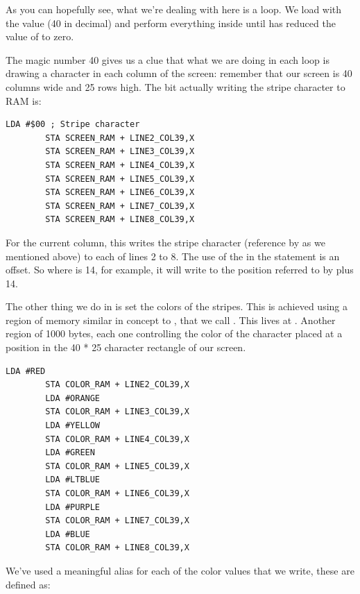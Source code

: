 As you can hopefully see, what we're dealing with here is a loop. We load  with the value  (40 in decimal)
and perform everything inside  until  has reduced the value of  to zero.

The magic number 40 gives us a clue that what we are doing in each loop is drawing a character in each column of the screen:
remember that our screen is 40 columns wide and 25 rows high. The bit actually writing the stripe character to RAM is:

\begin{lstlisting}[caption=In \icode{DrawStripesBehindTitle}]
        LDA #$00 ; Stripe character
        STA SCREEN_RAM + LINE2_COL39,X
        STA SCREEN_RAM + LINE3_COL39,X
        STA SCREEN_RAM + LINE4_COL39,X
        STA SCREEN_RAM + LINE5_COL39,X
        STA SCREEN_RAM + LINE6_COL39,X
        STA SCREEN_RAM + LINE7_COL39,X
        STA SCREEN_RAM + LINE8_COL39,X
\end{lstlisting}

For the current column, this writes the stripe character (reference by  as we mentioned above) to each of lines
2 to 8. The use of the  in the  statement is an offset. So where  is 14, for example,
it will write to the position referred to by  plus 14.



The other thing we do in  is set the colors of the stripes. This is achieved using a region of memory
similar in concept to , that we call . This lives at . Another 
region of 1000 bytes, each one controlling the color of the character placed at a position in the 40 * 25 character rectangle
of our screen.

\begin{lstlisting}[caption=In \icode{DrawStripesBehindTitle}]
        LDA #RED
        STA COLOR_RAM + LINE2_COL39,X
        LDA #ORANGE
        STA COLOR_RAM + LINE3_COL39,X
        LDA #YELLOW
        STA COLOR_RAM + LINE4_COL39,X
        LDA #GREEN
        STA COLOR_RAM + LINE5_COL39,X
        LDA #LTBLUE
        STA COLOR_RAM + LINE6_COL39,X
        LDA #PURPLE
        STA COLOR_RAM + LINE7_COL39,X
        LDA #BLUE
        STA COLOR_RAM + LINE8_COL39,X
\end{lstlisting}

We've used a meaningful alias for each of the color values that we write, these are defined as:

